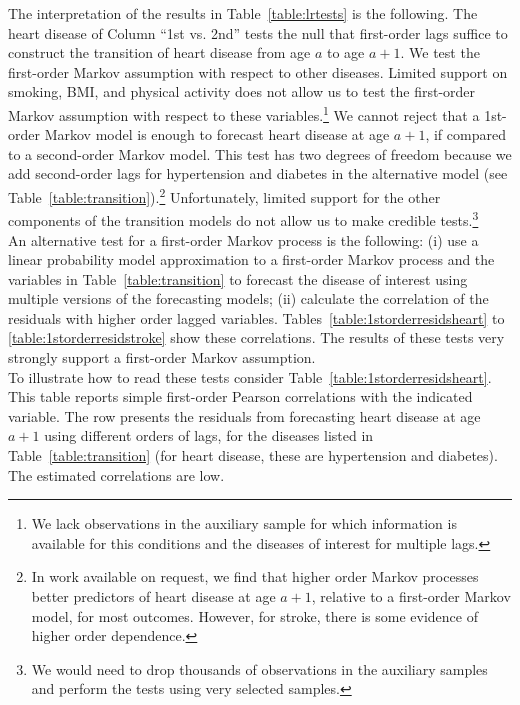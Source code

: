 \noindent The interpretation of the results in Table~\ref{table:lrtests} is the following. The heart disease of Column ``1st vs. 2nd'' tests the null that first-order lags suffice to construct the transition of heart disease from age $a$ to age $a+1$. We test the first-order Markov assumption with respect to other diseases. Limited support on smoking, BMI, and physical activity does not allow us to test the first-order Markov assumption with respect to these variables.\footnote{We lack observations in the auxiliary sample for which information is available for this conditions and the diseases of interest for multiple lags.} We cannot reject that a 1st-order Markov model is enough to forecast heart disease at age $a+1$, if compared to a second-order Markov model. This test has two degrees of freedom because we add second-order lags for hypertension and diabetes in the alternative model (see Table~\ref{table:transition}).\footnote{In work available on request, we find that higher order Markov processes better predictors of heart disease at age $a+1$, relative to a first-order Markov model, for most outcomes. However, for stroke, there is some evidence of higher order dependence.} Unfortunately, limited support for the other components of the transition models do not allow us to make credible tests.\footnote{We would need to drop thousands of observations in the auxiliary samples and perform the tests using very selected samples.}\\

\noindent An alternative test for a first-order Markov process is the following: (i) use a linear probability model approximation to a first-order Markov process and the variables in Table~\ref{table:transition} to forecast the disease of interest using multiple versions of the forecasting models; (ii) calculate the correlation of the residuals with higher order lagged variables. Tables~\ref{table:1storderresidsheart} to \ref{table:1storderresidstroke} show these correlations. The results of these tests very strongly support a first-order Markov assumption.\\

\noindent To illustrate how to read these tests consider Table~\ref{table:1storderresidsheart}. This table reports simple first-order Pearson correlations with the indicated variable. The row presents the residuals from forecasting heart disease at age $a+1$ using different orders of lags, for the diseases listed in Table~\ref{table:transition} (for heart disease, these are hypertension and diabetes). The estimated correlations are low.


